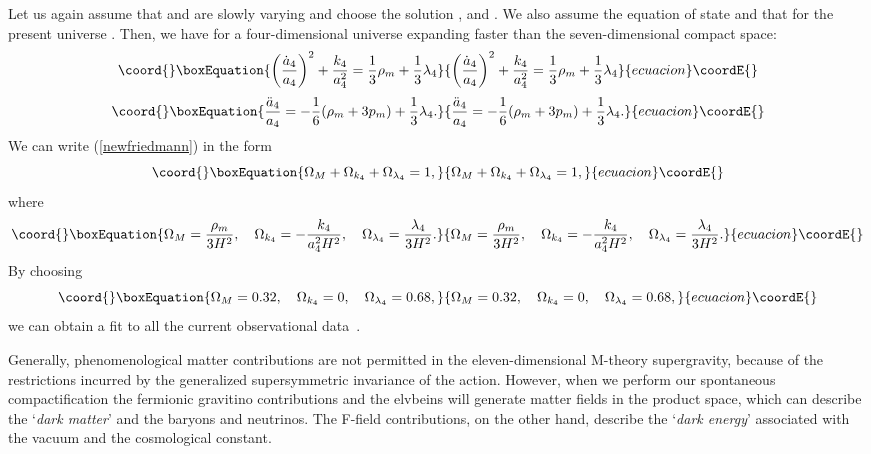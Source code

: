 \documentclass[a4paper,12pt]{article}
\begin{document}
Let us again assume that \coordHE{} and \coordHE{} are slowly varying
and choose the solution \coordHE{}, \coordHE{}
and \coordHE{}. We also assume the equation of
state \coordHE{} and that for the present universe \coordHE{}.
Then, we have for a four-dimensional universe expanding faster
than the seven-dimensional compact space:
\begin{equation}\coord{}\boxEquation{
\label{newfriedmann}
\biggl(\frac{{\dot a}_4}{a_4}\biggr)^2+\frac{k_4}{a_4^2}=
\frac{1}{3}\rho_m + \frac{1}{3}\lambda_4
}{
\biggl(\frac{{\dot a}_4}{a_4}\biggr)^2+\frac{k_4}{a_4^2}=
\frac{1}{3}\rho_m + \frac{1}{3}\lambda_4
}{ecuacion}\coordE{}\end{equation}
\begin{equation}\coord{}\boxEquation{
\label{accel}
\frac{{\ddot a}_4}{a_4}
=-\frac{1}{6}(\rho_m+3p_m)+\frac{1}{3}\lambda_4.
}{
\frac{{\ddot a}_4}{a_4}
=-\frac{1}{6}(\rho_m+3p_m)+\frac{1}{3}\lambda_4.
}{ecuacion}\coordE{}\end{equation}
We can write (\ref{newfriedmann}) in the form
\begin{equation}\coord{}\boxEquation{
\Omega_M+\Omega_{k_4}+\Omega_{\lambda_4}=1,
}{
\Omega_M+\Omega_{k_4}+\Omega_{\lambda_4}=1,
}{ecuacion}\coordE{}\end{equation}
where
\begin{equation}\coord{}\boxEquation{
\Omega_M=\frac{\rho_m}{3H^2},\quad
\Omega_{k_4}=-\frac{k_4}{a_4^2H^2},\quad
\Omega_{\lambda_4}=\frac{\lambda_4}{3H^2}.
}{
\Omega_M=\frac{\rho_m}{3H^2},\quad
\Omega_{k_4}=-\frac{k_4}{a_4^2H^2},\quad
\Omega_{\lambda_4}=\frac{\lambda_4}{3H^2}.
}{ecuacion}\coordE{}\end{equation}
By choosing
\begin{equation}\coord{}\boxEquation{
\Omega_M=0.32,\quad \Omega_{k_4}=0,\quad \Omega_{\lambda_4}=0.68,
}{
\Omega_M=0.32,\quad \Omega_{k_4}=0,\quad \Omega_{\lambda_4}=0.68,
}{ecuacion}\coordE{}\end{equation}
we can obtain a fit to all the current observational
data~\cite{Perlmutter,Netterfield}.

Generally, phenomenological matter contributions are not
permitted in the eleven-dimensional M-theory supergravity,
because of the restrictions incurred by the generalized
supersymmetric invariance of the action. However, when we perform our
spontaneous compactification the fermionic gravitino
contributions and the elvbeins will generate matter fields in the \coordHE{}
product space, which can describe the `{\it dark matter}' and the baryons and
neutrinos. The F-field contributions, on the other hand, describe the `{\it dark
energy}' associated with the vacuum and the cosmological constant.
\end{document}
